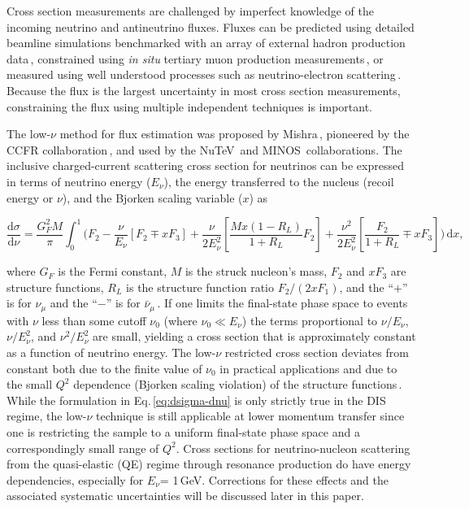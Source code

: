 \documentclass[%
reprint,
% 
superscriptaddress,
showpacs,
preprintnumbers,
showkeys,
nofootinbib,
 amsmath,amssymb,
 aps,
 prd,
floatfix,
]{revtex4-1}
\newcommand\numu     {$\nu_{\mu}$\xspace}
\newcommand\numubar  {$\bar{\nu}_{\mu}$\xspace}
\newcommand\lownu    {low-$\nu$\xspace}
\newcommand\enu      {$E_\nu$\xspace}
\begin{document}
Cross section measurements are challenged by imperfect knowledge of the incoming neutrino and antineutrino fluxes. Fluxes can be predicted using detailed beamline simulations benchmarked with an array of external hadron production data\,\cite{T2K-flux,NOMAD-xsec,Leo-thesis}, constrained using {\em in situ} tertiary muon production measurements\,\cite{Loiacono-thesis}, or measured using well understood processes such as neutrino-electron scattering\,\cite{minerva-nu-e-flux}. Because the flux is the largest uncertainty in most cross section measurements, constraining the flux using multiple independent techniques is important. 

The \lownu method for flux estimation was proposed by Mishra\,\cite{Mishra}, pioneered by the CCFR collaboration\,\cite{CCFR-xsec}, and used by the NuTeV\,\cite{NuTeV-xsec} and MINOS\,\cite{MINOS-xsec} collaborations.  The inclusive charged-current scattering cross section for neutrinos can be expressed in terms of neutrino energy (\enu), the energy transferred to the nucleus (recoil energy or $\nu$), and the Bjorken scaling variable ($x$) as
\begin{widetext}
\begin{equation}
    \frac{\mathrm{d}\sigma}{\mathrm{d}\nu} =
    \frac{G^2_F M}{\pi}
    \int_0^1 \bigg(
        F_2
        - \frac{\nu}{E_\nu}  \left[F_2 \mp xF_3\right]
        + \frac{\nu}{2E_\nu^2}  \left[\frac{Mx(1-R_L)}{1+R_L}F_2\right] 
        + \frac{\nu^2}{2E_\nu^2}  \left[\frac{F_2}{1+R_L} \mp xF_3\right]
    \bigg)\,\mathrm{d}x,
    \label{eq:dsigma-dnu}
\end{equation}
\end{widetext} 
where $G_F$ is the Fermi constant, $M$ is the struck nucleon's mass, $F_2$ and $xF_3$ are structure functions, $R_L$ is the structure function ratio $F_2/(2xF_1)$, and the ``$+$'' is for \numu and the ``$-$'' is for \numubar\,\cite{Josh-thesis}.  If one limits the final-state phase space to events with $\nu$ less than some cutoff $\nu_0$ (where $\nu_0 \ll E_\nu$) the terms proportional to $\nu/E_\nu$, $\nu/E_\nu^2$, and $\nu^2/E_\nu^2$ are small, yielding a cross section that is approximately constant as a function of neutrino energy. The \lownu restricted cross section deviates from constant both due to the finite value of $\nu_0$ in practical applications and due to the small $Q^2$ dependence (Bjorken scaling violation) of the structure functions\,\cite{Bodek:2012uu}. While the formulation in Eq.\,\ref{eq:dsigma-dnu} is only strictly true in the DIS regime, the \lownu technique is still applicable at lower momentum transfer since one is restricting the sample to a uniform final-state phase space and a correspondingly small range of $Q^2$. Cross sections for neutrino-nucleon scattering from the quasi-elastic (QE) regime through resonance production do have energy dependencies, especially for \enu = 1\,GeV. Corrections for these effects and the associated systematic uncertainties will be discussed later in this paper. 
\end{document}
